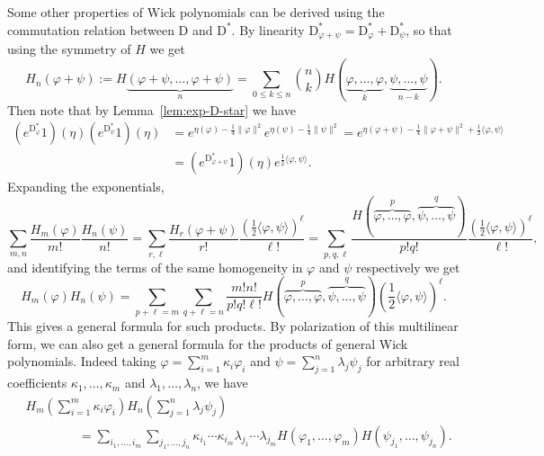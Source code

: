 \documentclass[a4paper,11pt]{article}
\newcommand{\assign}{:=}
\newcommand{\mathD}{\mathrm{D}}
\begin{document}
Some other properties of Wick polynomials can be derived using the commutation
relation between $\mathD$ and $\mathD^{\ast}$. By linearity
$\mathD^{\ast}_{\varphi + \psi} = \mathD^{\ast}_{\varphi} +
\mathD^{\ast}_{\psi}$, so that using the symmetry of $H$ we get
\[ H_n (\varphi + \psi) \assign H \underbrace{(\varphi + \psi, \ldots, \varphi
   + \psi)}_n = \sum_{0 \leqslant k \leqslant n} \binom{n}{k} H
   (\underbrace{\varphi, \ldots, \varphi}_k, \underbrace{\psi, \ldots,
   \psi}_{n - k}) . \]
Then note that by Lemma~\ref{lem:exp-D-star} we have
\begin{align*}
  (e^{\mathD^{\ast}_{\varphi}} 1) (\eta) (e^{\mathD^{\ast}_{\psi}} 1) (\eta)& = e^{\eta (\varphi) - \frac{1}{4} \| \varphi \|^2} e^{\eta (\psi) - \frac{1}{4} \| \psi \|^2} = e^{\eta (\varphi + \psi) - \frac{1}{4} \| \varphi + \psi \|^2 + \frac{1}{2} \langle \varphi, \psi \rangle} \\
  & = (e^{\mathD^{\ast}_{\varphi + \psi}} 1) (\eta) e^{\frac{1}{2} \langle \varphi, \psi \rangle}.
\end{align*}
Expanding the exponentials,
\[ \sum_{m, n}  \frac{H_m (\varphi)}{m!} \frac{H_n (\psi)}{n!} = \sum_{r,
   \ell} \frac{H_r (\varphi + \psi)}{r!} \frac{\left( \frac{1}{2} \langle
   \varphi, \psi \rangle \right)^{\ell}}{\ell !} = \sum_{p, q, \ell} \frac{H
   (\overbrace{\varphi, \ldots, \varphi}^p, \overbrace{\psi, \ldots,
   \psi}^q)}{p!q!} \frac{\left( \frac{1}{2} \langle \varphi, \psi \rangle
   \right)^{\ell}}{\ell !}, \]
and identifying the terms of the same homogeneity in $\varphi$ and $\psi$
respectively we get
\begin{equation}
  \label{eq:wick polynomial product} H_m (\varphi) H_n (\psi) = \sum_{p + \ell
  = m} \sum_{q + \ell = n} \frac{m!n!}{p!q! \ell !} H (\overbrace{\varphi,
  \ldots, \varphi}^p, \overbrace{\psi, \ldots, \psi}^q) \left( \frac{1}{2}
  \langle \varphi, \psi \rangle \right)^{\ell} .
\end{equation}
This gives a general formula for such products. By polarization of this
multilinear form, we can also get a general formula for the products of
general Wick polynomials. Indeed taking $\varphi = \sum_{i = 1}^m \kappa_i
\varphi_i$ and $\psi = \sum_{j = 1}^n \lambda_j \psi_j$ for arbitrary real
coefficients $\kappa_1, \ldots, \kappa_m$ and $\lambda_1, \ldots, \lambda_n$,
we have
\begin{align*}
    &H_m (\sum_{i = 1}^m \kappa_i \varphi_i) H_n (\sum_{j = 1}^n \lambda_j \psi_j) \\
    &\hspace{50pt} = \sum_{i_1, \ldots, i_m} \sum_{j_1, \ldots, j_n} \kappa_{i_1} \cdots \kappa_{i_m} \lambda_{j_1} \cdots \lambda_{j_m} H (\varphi_1, \ldots, \varphi_m) H (\psi_{j_1}, \ldots, \psi_{j_n}).
\end{align*}
\end{document}
